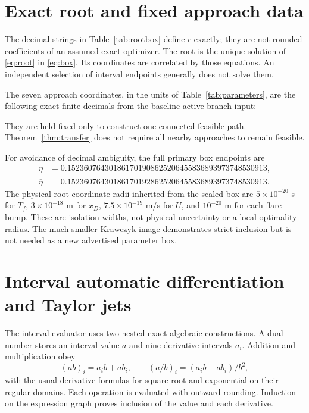 \section{Exact root and fixed approach data}\label{app:box}
The decimal strings in Table~\ref{tab:rootbox} define $c$ exactly; they are not rounded coefficients of an assumed exact optimizer. The root is the unique solution of \eqref{eq:root} in \eqref{eq:box}. Its coordinates are correlated by those equations. An independent selection of interval endpoints generally does not solve them.

The seven approach coordinates, in the units of Table~\ref{tab:parameters}, are the following exact finite decimals from the baseline active-branch input:

They are held fixed only to construct one connected feasible path. Theorem~\ref{thm:transfer} does not require all nearby approaches to remain feasible.

For avoidance of decimal ambiguity, the full primary box endpoints are
\begin{align*}
 \underline\eta&=0.152360764301861701908625206455836893973748530913,\\
 \overline\eta&=0.152360764301861701928625206455836893973748530913.
\end{align*}
The physical root-coordinate radii inherited from the scaled box are $5\times10^{-20}$ s for $T_f$, $3\times10^{-18}$ m for $x_D$, $7.5\times10^{-19}$ m/s for $U$, and $10^{-20}$ m for each flare bump. These are isolation widths, not physical uncertainty or a local-optimality radius. The much smaller Krawczyk image demonstrates strict inclusion but is not needed as a new advertised parameter box.

\section{Interval automatic differentiation and Taylor jets}\label{app:jets}
The interval evaluator uses two nested exact algebraic constructions. A dual number stores an interval value $a$ and nine derivative intervals $a_i$. Addition and multiplication obey
\[
 (ab)_i=a_i b+ab_i,\qquad
 (a/b)_i=(a_i b-ab_i)/b^2,
\]
with the usual derivative formulas for square root and exponential on their regular domains. Each operation is evaluated with outward rounding. Induction on the expression graph proves inclusion of the value and each derivative.

